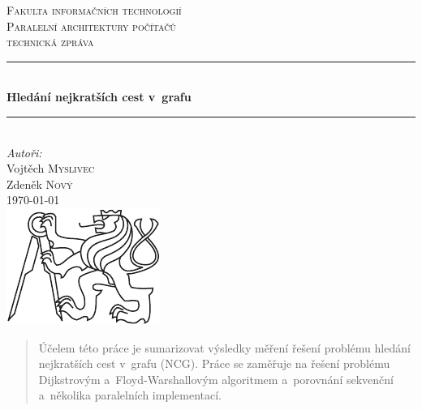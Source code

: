 \begin{titlepage}
\newcommand{\HRule}{\rule{\linewidth}{0.5mm}} %
\center

\textsc{\LARGE Fakulta informačních technologií}\\[1.5cm] %
\textsc{\Large Paralelní architektury počítačů}\\[0.5cm] %
\textsc{\large technická zpráva}\\[0.5cm] %


\HRule \\[0.4cm]
{ \huge \bfseries Hledání nejkratších cest v~grafu}\\[0.4cm] %
\HRule \\[1.5cm]

\Large \emph{Autoři:}\\
Vojtěch \textsc{Myslivec}\\
Zdeněk \textsc{Nový}\\[2cm]	%

{\large \today}\\[3cm] %

\includegraphics{cvut-logo-bw.pdf}\\[1cm] %

\vfill %
\end{titlepage}

\renewcommand\abstractname{\begin{flushright}\begin{LARGE}\textbf{Abstrakt}\end
{LARGE}\end{flushright}}
\newcommand{\keywords}[1]{\vspace{0.8cm}\textbf{Klíčová slova\hspace{0.2cm}} #1}
\noindent\makebox[\linewidth]{\rule{\textwidth}{0.4pt}}
\begin{abstract}
Účelem této práce je sumarizovat výsledky měření řešení problému hledání nejkratších cest v~grafu (NCG). Práce se zaměřuje na řešení problému Dijkstrovým a~Floyd-Warshallovým algoritmem a~porovnání sekvenční a~několika paralelních implementací.
\end{abstract}

